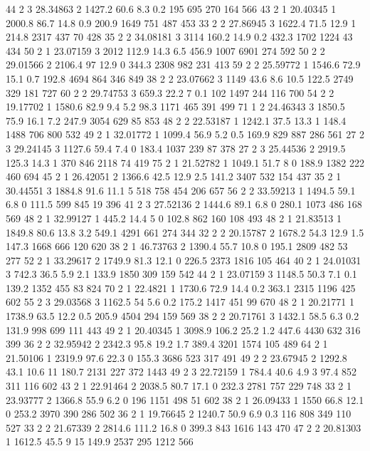 44	2	3	28.34863	2	1427.2	60.6	8.3		0.2		195		695		270		164		566
43	2	1	20.40345	1	2000.8	86.7	14.8	0.9		200.9	1649	751		487		453
33	2	2	27.86945	3	1622.4	71.5	12.9	1		214.8	2317	437		70		428
35	2	2	34.08181	3	3114	160.2	14.9	0.2		432.3	1702	1224	43		434
50	2	1	23.07159	3	2012	112.9	14.3	6.5		456.9	1007	6901	274		592
50	2	2	29.01566	2	2106.4	97		12.9	0		344.3	2308	982		231		413
59	2	2	25.59772	1	1546.6	72.9	15.1	0.7		192.8	4694	864		346		849
38	2	2	23.07662	3	1149	43.6	8.6		10.5	122.5	2749	329		181		727
60	2	2	29.74753	3	659.3	22.2	7		0.1		102		1497	244		116		700
54	2	2	19.17702	1	1580.6	82.9	9.4		5.2		98.3	1171	465		391		499
71	1	2	24.46343	3	1850.5	75.9	16.1	7.2		247.9	3054	629		85		853
48	2	2	22.53187	1	1242.1	37.5	13.3	1		148.4	1488	706		800		532
49	2	1	32.01772	1	1099.4	56.9	5.2		0.5		169.9	829		887		286		561
27	2	3	29.24145	3	1127.6	59.4	7.4		0		183.4	1037	239		87		378
27	2	3	25.44536	2	2919.5	125.3	14.3	1		370		846		2118	74		419
75	2	1	21.52782	1	1049.1	51.7	8		0		188.9	1382	222		460		694
45	2	1	26.42051	2	1366.6	42.5	12.9	2.5		141.2	3407	532		154		437
35	2	1	30.44551	3	1884.8	91.6	11.1	5		518		758		454		206		657
56	2	2	33.59213	1	1494.5	59.1	6.8		0		111.5	599		845		19		396
41	2	3	27.52136	2	1444.6	89.1	6.8		0		280.1	1073	486		168		569
48	2	1	32.99127	1	445.2	14.4	5		0		102.8	862		160		108		493
48	2	1	21.83513	1	1849.8	80.6	13.8	3.2		549.1	4291	661		274		344
32	2	2	20.15787	2	1678.2	54.3	12.9	1.5		147.3	1668	666		120		620
38	2	1	46.73763	2	1390.4	55.7	10.8	0		195.1	2809	482		53		277
52	2	1	33.29617	2	1749.9	81.3	12.1	0		226.5	2373	1816	105		464
40	2	1	24.01031	3	742.3	36.5	5.9		2.1		133.9	1850	309		159		542
44	2	1	23.07159	3	1148.5	50.3	7.1		0.1		139.2	1352	455		83		824
70	2	1	22.4821	    1	1730.6	72.9	14.4	0.2		363.1	2315	1196	425		602
55	2	3	29.03568	3	1162.5	54		5.6		0.2		175.2	1417	451		99		670
48	2	1	20.21771	1	1738.9	63.5	12.2	0.5		205.9	4504	294		159		569
38	2	2	20.71761	3	1432.1	58.5	6.3		0.2		131.9	998		699		111		443
49	2	1	20.40345	1	3098.9	106.2	25.2	1.2		447.6	4430	632		316		399
36	2	2	32.95942	2	2342.3	95.8	19.2	1.7		389.4	3201	1574	105		489
64	2	1	21.50106	1	2319.9	97.6	22.3	0		155.3	3686	523		317		491
49	2	2	23.67945	2	1292.8	43.1	10.6	11		180.7	2131	227		372		1443
49	2	3	22.72159	1	784.4	40.6	4.9		3		97.4	852		311		116		602
43	2	1	22.91464	2	2038.5	80.7	17.1	0		232.3	2781	757		229		748
33	2	1	23.93777	2	1366.8	55.9	6.2	0	196		1151	498		51		602
38	2	1	26.09433	1	1550	66.8	12.1	0		253.2	3970	390		286		502
36	2	1	19.76645	2	1240.7	50.9	6.9		0.3		116		808		349		110		527
33	2	2	21.67339	2	2814.6	111.2	16.8	0		399.3	843		1616	143		470
47	2	2	20.81303	1	1612.5	45.5	9		15		149.9	2537	295		1212	566
